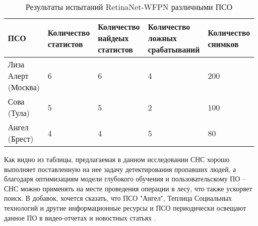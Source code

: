 \begin{table}[H]
    \caption{Результаты испытаний RetinaNet-WFPN различными ПСО}\label{usage-results}
    \begin{tabular}{|p{2.8cm}|p{3cm}|p{3cm}|p{3cm}|p{3cm}|}
        \hline
        {ПСО} & {Количество статистов} & {Количество найдеых статистов} & {Количество ложных срабатываний} & {Количество снимков} \\
        \hline
        Лиза Алерт (Москва) & 6 & 6 & 4 & 200 \\
        \hline
        Сова (Тула) & 5 & 5 & 2 & 100 \\
        \hline
        Ангел (Брест) & 4 & 4 & 5 & 80 \\
        \hline
    \end{tabular}
\end{table}

Как видно из таблицы, предлагаемая в данном исследовании СНС хорошо выполняет поставленную на нее задачу детектирования пропавших людей, а благодаря оптимизациям модели глубокого обучения и пользовательскому ПО -- СНС можно применять на месте проведения операции в лесу, что также ускоряет поиск. В добавок, хочется сказать, что ПСО "Ангел", Теплица Социальных технологий и другие информационные ресурсы и ПСО периодически освещают данное ПО в видео-отчетах \cite{lib-lacmus-pr1} \cite{lib-lacmus-pr2} и новостных статьях \cite{lib-lacmus-pr3} \cite{lib-lacmus-pr4} \cite{lib-lacmus-pr5}.